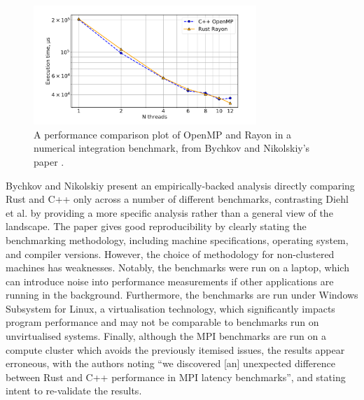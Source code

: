 \begin{figure}[H]
    \centering
    \includegraphics[width=0.75\textwidth]{images/2_background/supercomputing_openmp_rayon.png}
    \caption{A performance comparison plot of OpenMP and Rayon in a numerical integration benchmark, from Bychkov and Nikolskiy's paper \cite{bychkovRustLanguageSupercomputing2021}.}
    \label{fig:supercomputing_openmp_rayon}
\end{figure}

Bychkov and Nikolskiy present an empirically-backed analysis directly comparing Rust and C++ only across a number of different benchmarks, contrasting Diehl et al. by providing a more specific analysis rather than a general view of the landscape. The paper gives good reproducibility by clearly stating the benchmarking methodology, including machine specifications, operating system, and compiler versions. However, the choice of methodology for non-clustered machines has weaknesses. Notably, the benchmarks were run on a laptop, which can introduce noise into performance measurements if other applications are running in the background. Furthermore, the benchmarks are run under Windows Subsystem for Linux, a virtualisation technology, which significantly impacts program performance and may not be comparable to benchmarks run on unvirtualised systems. Finally, although the MPI benchmarks are run on a compute cluster which avoids the previously itemised issues, the results appear erroneous, with the authors noting ``we discovered [an] unexpected difference between Rust and C++ performance in MPI latency benchmarks'', and stating intent to re-validate the results.








